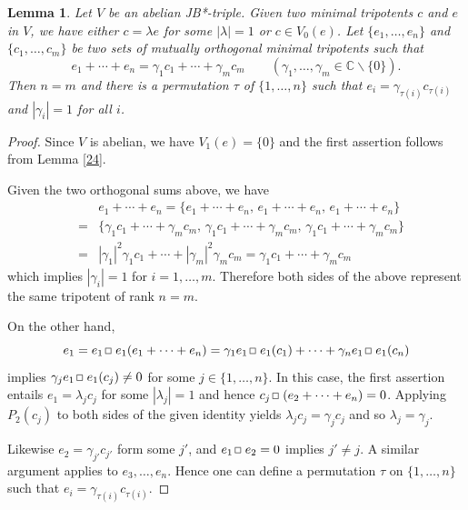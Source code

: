 \documentclass[12pt, twoside]{article}
\def\sqr#1#2{{\,\vcenter{\vbox{\hrule height.#2pt\hbox{\vrule width.#2pt
height#1pt \kern#1pt\vrule width.#2pt}\hrule height.#2pt}}\,}}
\def\bo{\sqr44\,}
\newtheorem{lemma}[theorem]{Lemma}
\theoremstyle{definition}
\numberwithin{equation}{section}
\begin{document}
\begin{lemma}\label{sum} Let $V$ be an abelian JB*-triple. Given two minimal tripotents $c$ and $e$ in $V$,
we have either $c= \lambda e$ for some $|\lambda|=1$ or $c\in V_0(e)$.
Let $\{e_1, \ldots, e_n\}$ and $\{c_1, \ldots, c_m\}$ be two sets of mutually orthogonal
minimal tripotents such that
$$e_1 + \cdots + e_n = \gamma_1c_1 + \cdots +\gamma_m c_m \qquad (\gamma_1, \dots,\gamma_m \in \mathbb{C}\backslash\{0\}).$$
Then $n=m$ and there is a permutation $\tau$ of $\{1, \ldots, n\}$ such that $e_i = \gamma_{\tau(i)} c_{\tau(i)}$
 and  $|\gamma_i|=1$ for all $i$.
 \end{lemma}
\begin{proof}
Since $V$ is abelian, we have $V_1(e)=\{0\}$ and
the first assertion follows from Lemma \ref{24}.

Given the two orthogonal sums  above, we have
\begin{eqnarray*}
&&e_1 + \cdots + e_n= \{e_1 + \cdots + e_n,\, e_1 + \cdots + e_n,\, e_1 + \cdots + e_n\}\\
&=& \{ \gamma_1c_1 + \cdots +\gamma_m c_m, \, \gamma_1c_1 + \cdots +\gamma_m c_m,
\, \gamma_1c_1 + \cdots +\gamma_m c_m \}\\
&=&  |\gamma_1|^2\gamma_1c_1 + \cdots +|\gamma_m|^2\gamma_m c_m = \gamma_1c_1 + \cdots +\gamma_m c_m
\end{eqnarray*}
which implies  $|\gamma_i|=1$ for $i=1, \ldots, m$.
Therefore both sides of the above  represent the same tripotent of rank $n=m$.

On the other hand,
$$e_1 = e_1 \bo e_1(e_1+ \cdots+e_n) = \gamma_1 e_1 \bo e_1(c_1) + \cdots + \gamma_n e_1 \bo e_1(c_n)$$
implies $\gamma_j e_1 \bo e_1(c_j) \neq 0$ for some $j\in \{1, \ldots, n\}$.
In this case, the first assertion entails $e_1 = \lambda_jc_j$ for some $|\lambda_j|=1$
and hence $c_j \bo (e_2 + \cdots + e_n) =0$.
Applying $P_2(c_j)$ to both sides of the given identity yields
$\lambda_j c_j =\gamma_j c_j$ and so $\lambda_j = \gamma_j$.

 Likewise
$e_2 = \gamma_{j'} c_{j'}$ form some $j'$, and $e_1 \bo e_2 =0$ implies $j'\neq j$.
A similar argument applies to $e_3, \ldots, e_n$.
 Hence one can define
a permutation $\tau$ on $\{1, \ldots ,n\}$ such that $e_i = \gamma_{\tau (i)}c_{\tau(i)}$.
\end{proof}
\end{document}
